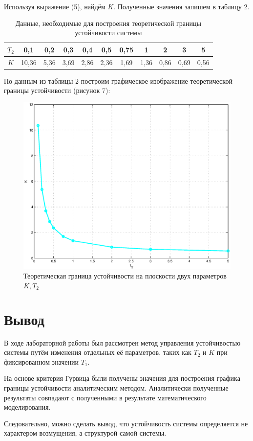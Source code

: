 \documentclass[12pt,a4paper]{article}
\begin{document}
Используя выражение (5), найдём $K$. Полученные значения запишем в таблицу 2.
\begin{table}[h!]
	\caption{Данные, необходимые для построения теоретической границы устойчивости системы}
	\renewcommand{\arraystretch}{1.8} %
	\begin{center}
		\begin{tabular}{|c|c|c|c|c|c|c|c|c|c|c|}
			\hline $T_2$ & 0,1 & 0,2 & 0,3 & 0,4 & 0,5 & 0,75 & 1 & 2 & 3 & 5\\
			\hline $K$ & 10,36 & 5,36 & 3,69 & 2,86 & 2,36 & 1,69 & 1,36 & 0,86 & 0,69 & 0,56\\
			\hline
		\end{tabular}	
	\end{center}
\end{table}  
 
По данным из таблицы 2 построим графическое изображение теоретической границы устойчивости (рисунок 7):
\begin{figure}[H]
	\centering
	\includegraphics[width=0.9\linewidth]{scheme/plot4.eps}
	\caption{Теоретическая граница устойчивости на плоскости двух параметров $K, T_2$}
\end{figure}

\newpage
\section*{Вывод}
\par
В ходе лабораторной работы был рассмотрен метод управления устойчивостью системы путём изменения отдельных её параметров, таких как  $T_2$ и $K$ при фиксированном значении $T_1$.
\par
На основе критерия Гурвица были получены значения для построения графика границы устойчивости аналитическим методом. Аналитически полученные результаты совпадают с полученными в результате математического моделирования.
\par
Следовательно, можно сделать вывод, что устойчивость системы определяется не характером возмущения, а структурой самой системы.
\end{document}
